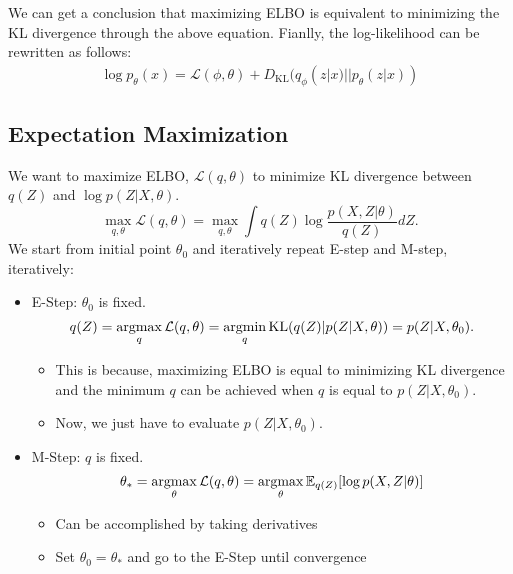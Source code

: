 We can get a conclusion that maximizing ELBO is equivalent to minimizing the KL divergence through the above equation. Fianlly, the log-likelihood can be rewritten as follows:
\begin{align*}
	\log p_{\theta}(x) = \mathcal{L}(\phi,\theta) + D_{\textrm{KL}}(q_{\phi}(z|x)||p_{\theta}(z|x))
\end{align*}



\subsection{Expectation Maximization}
We want to maximize ELBO, $\mathcal{L}(q,\theta)$ to minimize KL divergence between $q(Z)$ and $\log p(Z|X,\theta)$.
$$\max_{q,\theta}\mathcal{L}(q,\theta) = \max_{q,\theta}\int q(Z)\log \frac{p(X,Z|\theta)}{q(Z)}dZ.$$
We start from initial point $\theta_0$ and iteratively repeat \Ni E-step and \Nii M-step, iteratively:
\begin{itemize}
	\item E-Step: $\theta_0$ is fixed. 
		$$q(Z) = \operatorname*{\operatorname{argmax}}_{q}\mathcal{L}(q,\theta) = \operatorname*{\operatorname{argmin}}_{q}\textrm{KL}(q(Z)|p(Z|X,\theta)) = p(Z|X,\theta_0).$$ 
		\begin{itemize}
			\item This is because, maximizing ELBO is equal to minimizing KL divergence and the minimum $q$ can be achieved when $q$ is equal to $p(Z|X,\theta_0)$.
			\item Now, we just have to evaluate $p(Z|X,\theta_0)$.
		\end{itemize}
	\item M-Step: $q$ is fixed.
		$$\theta_* = \operatorname*{\operatorname{argmax}}_{\theta}\mathcal{L}(q,\theta) = \operatorname*{\operatorname{argmax}}_{\theta}\mathbb{E}_{q(Z)}[\log p(X,Z|\theta)]$$
		\begin{itemize}
			\item Can be accomplished by taking derivatives
			\item Set $\theta_0=\theta_*$ and go to the E-Step until convergence
		\end{itemize}
	
\end{itemize}

